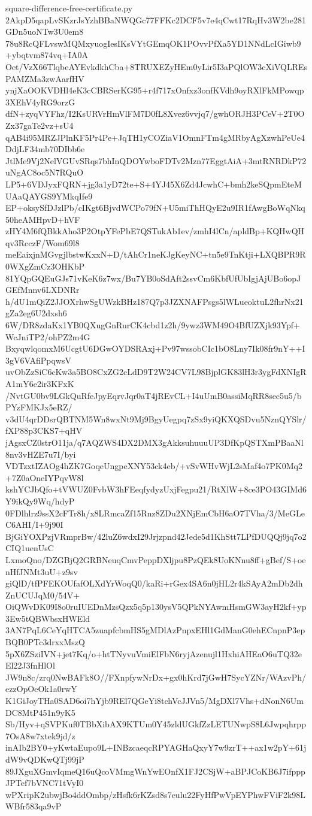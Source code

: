 \documentclass[11pt]{article}
\theoremstyle{definition}
\theoremstyle{remark}
\begin{document}
\begin{filecontents*}[overwrite]{square-difference-free-certificate.py}
2AkpD5qapLvSKzrJsYzhBBaNWQGc77FFKc2DCF5v7e4qCwt17RqHv3W2be281GDn5uoNTw3U0em8
78u8RcQFLvswMQMxyuogIesIKsVYtGEmqOK1POvvPfXa5YD1NNdLcIGiwb9+ybqtvm874vq+IA0A
Oet/VzX66TlqbeAYEvkdkhCba+8TRUXEZyHEm0yLir5I3aPQlOW3cXiVQLREsPAMZMa3zwAarfHV
ynjXaOOKVDHl4eK3cCBRSerKG95+r4f717xOnfxz3onfKVdh9oyRXlFkMPowqp3XEhV4yRG9orzG
dfN+zyqVYFhz/I2KsURVrHmVlFM7D0fL8Xvez6vvjq7/gwhORJH3PCeV+2T0OZx37gaTe2vz+sU4
qAB4i95MRZJPlnKF5Pr4Pe+JqTH1yCOZiaV1OmnFTm4gMRbyAgXzwhPeUe4DdjLF34mb70DIbb6e
JtlMe9Vj2NelVGUvSRqs7bhInQDOYwboFDTv2Mzn77EggtAiA+3mtRNRDkP72uNgAC8oc5N7RQuO
LP5+6VDJyxFQRN+jg3a1yD72te+S+4YJ45X6Zd4JcwhC+bmh2keSQpmEteMUAaQAYGS9YMkqIfe9
EP+oksySfDJzlPb/cIKgt6BjvdWCPo79fN+U5miThHQyE2u9IR1fAwgBoWqNkq50heAMHpvD+hVF
zHY4M6fQBkkAho3P2OtpYFePbE7QSTukAb1ev/zmhI4lCn/apldBp+KQHwQHqv3RcczF/Wom69l8
meEaixjnMGvgjlbstwKxxN+D/tAhCr1neKJgKeyNC+tn5e9TnKtji+LXQBPR9R0WXgZmCz3OHKbP
81YQpGQEuGJs71vKeK6z7wx/Bu7YB0oSdAft2ssvCm6KbfUfUbIgjAjUBo6opJGEfMnnv6LXDNRr
h/dU1mQiZ2JJOXrhwSgUWzkBHz187Q7p3JZXNAFPsgs5lWLueoktuL2fhrNx21gZa2eg6U2dxsh6
6W/DR8zdaKx1YB0QXugGnRurCK4cbd1z2h/9ywz3WM49O4BfUZXjk93Ypf+WcJniTP2/ohPZ2m4G
BxyqwlqomxM6UcgtU6DGwOYDSRAxj+Pv97wssobCIc1bO8Lny7Ik08fr9nY++I3gV6VAfiPpqwsV
uvObZzSiC6cKw3a5BO8CxZG2cLdD9T2W24CV7L98BjplGK83lH3r3ygFdXNIgRA1mY6e2ir3KFxK
/NvtGU0bv9LGkQuRfeJpyEqrvJqr0aT4jREvCL+I4uUmB0assiMqRR8sec5u5/bPYzFMKJx5eRZ/
v3dU4qrDDsrQBTNM5Wn8wxNt9Mj9BgyUegpq7zSx9yiQKXQSDvu5NznQYSlr/fXP88p3CKS7+qHV
jAgsxCZ0strO11ja/q7AQZWS4DX2DMX3gAkksuhuuuUP3DfKpQSTXmPBaaNl8nv3vHZE7u7I/byi
VDTzxtIZAOg4hZK7GoqeUngpeXNY53ck4eb/+vSvWHvWjL2sMaf4o7PK0Mq2+7Z0aOneIYPqvW8l
kshYCJbQfo+tVWUZ0FvbW3hFEeqfydyzUxjFegpu21/RtXlW+8ce3PO43GIMd6Y9ikQy9Wq/hdyP
0FDlhlrz9ssX2cFTr8h/x8LRmcaZf15Rnz8ZDu2XNjEmCbH6aO7TVha/3/MeGLeC6AHI/I+9j90I
BjGiYOXPzjVRmprBw/42luZ6wdxI29Jrjzpnd42Jede5d1KhStt7LPfDUQQj9jq7o2CIQ1uenUsC
LxmoQno/DZGBjQ2GRBNeuqCmvPeppDXljpu8PzQEk8UoKNnu8ff+gBef/S+oenHfJNMt3uU+z9sv
giQlD/tfPFEKOUfafOLXdYrWoqQ0/kaRi+rGex4SA6n0jHL2r4kSAyA2mDb2dhZnUCUJqM0/54V+
OiQWvDK09I8o0ruIUEDnMzsQzx5q5p130ysV5QPkNYAwmHsmGW3ayH2kf+yp3Ew5tQBWbsxHWEld
3AN7PqL6CeYqHTCA5zuapfcbmHS5gMDlAzPnpxEHl1GdManG0ehECnpnP3epBQB0PTc3drxxMszQ
5pX6ZSziIVN+jet7Kq/o+htTNyvuVmiElFbN6ryjAzenujl1HxhiAHEaO6uTQ32eEl22J3fnHlOl
JW9n8c/zrq0NwBAFk8O//FXnpfywNrDx+gx0hKrd7jGwH7SycYZNr/WAzvPh/ezzOpOeOk1a0rwY
K1GiJoyTHa0SAD6oi7hYjb9REl7QGeYi8tchVcJJVn5/MgDXl7Vhs+dNonN6UmDC8MtP451n9yK5
Sb/Hyv+qSVPKuf0TBbXibAX9KTUm0Y45zldUGkfZzLETUNwpS8L6Jwpqhrpp7OsA8w7xtek9jd/z
inAIb2BY0+yKwtaEupo9L+INBzcaeqcRPYAGHaQxyY7w9zrT++ax1w2pY+61jdW9vQDKwQTj99jP
89JXguXGmvIqmeQ16uQcoVMmgWnYwEOnfX1FJ2CSjW+aBPJCoKB6J7ifpppJPTef7bVNC71tVyI0
wPXripK2ubwjBo4ddOmbp/zHsfk6rKZsd8s7eulu22FyHfPwVpEYPhwFViF2k98LWBfr583qa9vP

\end{filecontents*}
\end{document}
